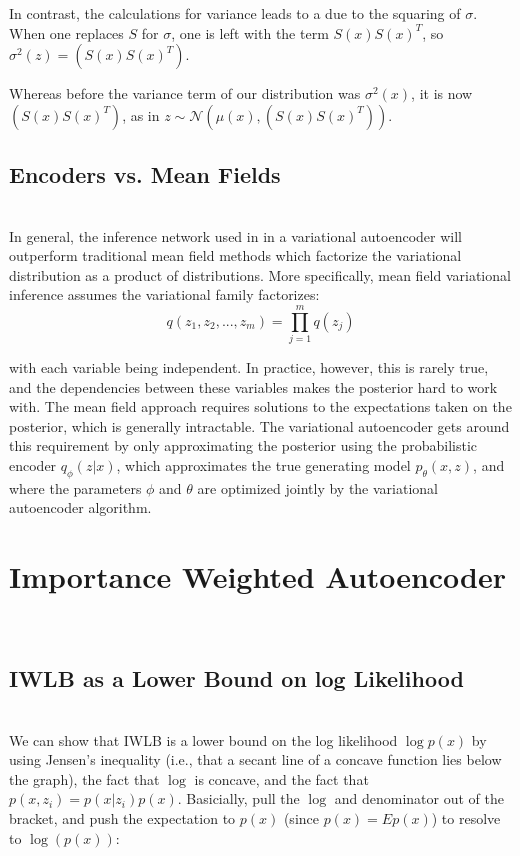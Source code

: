 \documentclass{amsart}
\numberwithin{equation}{section}
\theoremstyle{definition}
\theoremstyle{remark}
\begin{document}
In contrast, the calculations for variance leads to a due to the squaring of 
$\sigma$. When one replaces $S$ for $\sigma$, one is left with the term 
$S(x)S(x)^T$, so $\sigma^2(z) = \left(S(x)S(x)^T\right)$.

Whereas before the variance term of our distribution was 
$\sigma^2(x)$, it is now $\left(S(x) S(x)^T\right)$, as in 
$z \sim \mathcal{N}(\mu(x), \left(S(x) S(x)^T\right) )$.\\

\subsection{Encoders vs. Mean Fields} \\

In general, the inference network used in in a variational autoencoder will 
outperform traditional mean field methods which factorize the variational
distribution as a product of distributions. More specifically, mean field 
variational inference assumes the variational family factorizes: \\

$$ q(z_1, z_2, ..., z_m) = \prod_{j=1}^m q(z_j) $$

with each variable being independent. In practice, however, this is rarely true,
and the dependencies between these variables makes the posterior hard to work 
with. The mean field approach requires solutions to the expectations taken on 
the posterior, which is generally  intractable. The variational autoencoder gets 
around this requirement by only approximating the posterior using the 
probabilistic encoder $ q_{\phi}(z|x) $, which approximates the true generating
model $ p_{\theta}(x,z) $, and where the parameters $\phi$ and $\theta$ are 
optimized jointly by the variational autoencoder algorithm.

\section{Importance Weighted Autoencoder} \\

\subsection{IWLB as a Lower Bound on log Likelihood} \\

We can show that IWLB is a lower bound on the log likelihood $\log p(x)$ by 
using Jensen's inequality (i.e., that a secant line of a concave function 
lies below the graph), the fact that $\log$ is concave, and the fact that 
$p(x,z_i)= p(x|z_i)p(x)$. Basicially, pull the $\log$ and denominator out
of the bracket, and push the expectation to $p(x)$ (since $p(x) = Ep(x)$)
to resolve to $\log(p(x))$: \\
\end{document}
